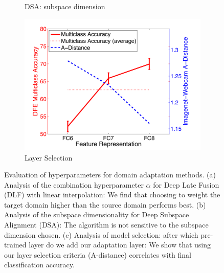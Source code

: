 \begin{figure}
\begin{subfigure}[b]{0.27\textwidth}
\caption{DSA: subspace dimension}
\label{fig:sagfk-eval}
\end{subfigure}
%
\begin{subfigure}[b]{0.28\textwidth}
\centering
\includegraphics[height=\linewidth]{figs/imgnet_webcam_a_dist_with_avg}
\caption{Layer Selection}
\label{fig:a-dist-eval}
\end{subfigure}
%
\caption{Evaluation of hyperparameters for domain adaptation methods. (a) Analysis of the combination hyperparameter $\alpha$ for Deep Late Fusion (DLF) with linear interpolation: We find that choosing to weight the target domain higher than the source domain performs best.  (b) Analysis of the subspace dimensionality for Deep Subspace Alignment (DSA): The algorithm is not sensitive to the subspace dimension chosen. (c) Analysis of model selection: after which pre-trained layer do we add our adaptation layer: We show that using our layer selection criteria (A-distance) correlates with final classification accuracy.}
\label{fig:hyperparam-eval}
\end{figure}
